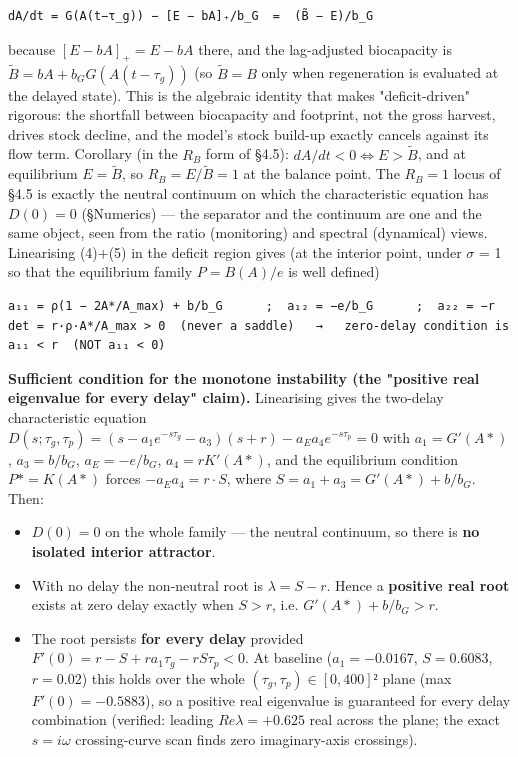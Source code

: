 \documentclass[11pt]{article}
\begin{document}
\begingroup\small\begin{verbatim}
dA/dt = G(A(t−τ_g)) − [E − bA]₊/b_G  =  (B̃ − E)/b_G
\end{verbatim}\endgroup

because $[E - bA]_{+} = E - bA$ there, and the lag-adjusted biocapacity is $\tilde{B} = bA + b_{G} G(A(t-\tau{}_{g}))$ (so $\tilde{B} = B$ only when regeneration is evaluated at the delayed state). This is the algebraic identity that makes "deficit-driven" rigorous: the shortfall between biocapacity and footprint, not the gross harvest, drives stock decline, and the model's stock build-up exactly cancels against its flow term. Corollary (in the $R_{B}$ form of §4.5): $dA/dt < 0 \iff{} E > \tilde{B}$, and at equilibrium $E = \tilde{B}$, so $R_{B} = E/\tilde{B} = 1$ at the balance point. The $R_{B} = 1$ locus of §4.5 is exactly the neutral continuum on which the characteristic equation has $D(0) = 0$ (§Numerics) — the separator and the continuum are one and the same object, seen from the ratio (monitoring) and spectral (dynamical) views. Linearising (4)+(5) in the deficit region gives (at the interior point, under \ensuremath{\sigma{}} = 1 so that the equilibrium family $P = B(A)/e$ is well defined)

\begingroup\small\begin{verbatim}
a₁₁ = ρ(1 − 2A*/A_max) + b/b_G      ;  a₁₂ = −e/b_G      ;  a₂₂ = −r
det = r·ρ·A*/A_max > 0  (never a saddle)   →   zero-delay condition is  a₁₁ < r  (NOT a₁₁ < 0)
\end{verbatim}\endgroup

\textbf{Sufficient condition for the monotone instability (the "positive real eigenvalue for every delay" claim).} Linearising gives the two-delay characteristic equation $D(s;\tau{}_{g},\tau{}_{p}) = (s - a_{1}e^{-s\tau{}_{g}} - a_{3})(s + r) - a_{E} a_{4} e^{-s\tau{}_{p}} = 0$ with $a_{1} = G\prime{}(A*)$, $a_{3} = b/b_{G}$, $a_{E} = -e/b_{G}$, $a_{4} = r K\prime{}(A*)$, and the equilibrium condition $P* = K(A*)$ forces $-a_{E} a_{4} = r\cdot{}S$, where $S = a_{1} + a_{3} = G\prime{}(A*) + b/b_{G}$. Then:

\begin{itemize}
\item $D(0) = 0$ on the whole family — the neutral continuum, so there is \textbf{no isolated interior attractor}.
\item With no delay the non-neutral root is $\lambda{} = S - r$. Hence a \textbf{positive real root} exists at zero delay exactly when $S > r$, i.e. $G\prime{}(A*) + b/b_{G} > r$.
\item The root persists \textbf{for every delay} provided $F\prime{}(0) = r - S + r a_{1} \tau{}_{g} - r S \tau{}_{p} < 0$. At baseline ($a_{1} = -0.0167$, $S = 0.6083$, $r = 0.02$) this holds over the whole $(\tau{}_{g}, \tau{}_{p}) \in{} [0,400]²$ plane (max $F\prime{}(0) = -0.5883$), so a positive real eigenvalue is guaranteed for every delay combination (verified: leading $Re \lambda{} = +0.625$ real across the plane; the exact $s = i\omega{}$ crossing-curve scan finds zero imaginary-axis crossings).
\end{itemize}
\end{document}
